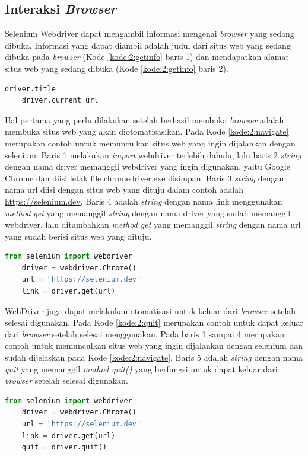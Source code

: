 \subsection{Interaksi \textit{Browser}}
Selenium Webdriver dapat mengambil informasi mengenai \textit{browser} yang sedang dibuka. Informasi yang dapat diambil adalah judul dari situs web yang sedang dibuka pada \textit{browser} (Kode \ref{kode:2:getinfo} baris 1) dan mendapatkan alamat situs web yang sedang dibuka (Kode \ref{kode:2:getinfo} baris 2). 
\begin{lstlisting}[language=python, caption=Contoh Potongan Kode \textit{Get Title} dan \textit{Get Current URL}, label=kode:2:getinfo]
	driver.title
	driver.current_url
\end{lstlisting}
Hal pertama yang perlu dilakukan setelah berhasil membuka \textit{browser} adalah membuka situs web yang akan diotomatisasikan. Pada Kode \ref{kode:2:navigate} merupakan contoh untuk memunculkan situs web yang ingin dijalankan dengan selenium. Baris 1 melakukan \textit{import} webdriver terlebih dahulu, lalu baris 2 \textit{string} dengan nama driver memanggil webdriver yang ingin digunakan, yaitu Google Chrome dan diisi letak file chromedriver.exe disimpan. Baris 3 \textit{string} dengan nama url diisi dengan situs web yang dituju dalam contoh adalah \url{https://selenium.dev}. Baris 4 adalah \textit{string} dengan nama link menggunakan \textit{method get} yang memanggil \textit{string} dengan nama driver yang sudah memanggil webdriver, lalu ditambahkan \textit{method get} yang memanggil \textit{string} dengan nama url yang sudah berisi situs web yang dituju.
\begin{lstlisting}[language=python, caption=Contoh kode Navigate to, label=kode:2:navigate]
	from selenium import webdriver
	driver = webdriver.Chrome()
	url = "https://selenium.dev"
	link = driver.get(url)
\end{lstlisting}
WebDriver juga dapat melakukan otomatisasi untuk keluar dari \textit{browser} setelah selesai digunakan. Pada Kode \ref{kode:2:quit} merupakan contoh untuk dapat keluar dari \textit{browser} setelah selesai menggunakan. Pada baris 1 sampai 4 merupakan contoh untuk memunculkan situs web yang ingin dijalankan dengan selenium dan sudah dijelaskan pada Kode \ref{kode:2:navigate}. Baris 5 adalah \textit{string} dengan nama \textit{quit} yang memanggil \textit{method quit()} yang berfungsi untuk dapat keluar dari \textit{browser} setelah selesai digunakan.
\begin{lstlisting}[language=python, caption=Contoh kode Get title, label=kode:2:quit]
	from selenium import webdriver
	driver = webdriver.Chrome()
	url = "https://selenium.dev"
	link = driver.get(url)
	quit = driver.quit()
\end{lstlisting}

